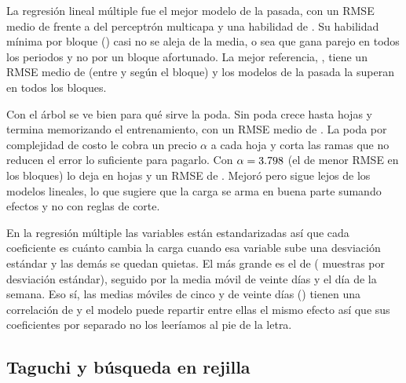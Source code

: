 \begin{table}[!htbp]
\centering
{}
\caption{Pasada didáctica de regresión con la media y la desviación entre
bloques: Las tres primeras filas son referencias sin modelo y la habilidad se
mide frente a , que es la mejor de ellas.}
\label{tab:reg-didactica}
\end{table}

La regresión lineal múltiple fue el mejor modelo de la pasada, con un RMSE
medio de \RegRMSELinealDidactico{} frente a \RegRMSEMLPDidactico{} del
perceptrón multicapa y una habilidad de \RegHabilidadMejorDidactico{}. Su
habilidad mínima por bloque (\RegHabilidadMinMejorDidactico{}) casi no se
aleja de la media, o sea que gana parejo en todos los periodos y no por un
bloque afortunado. La mejor referencia, \codigo{\RegMejorReferencia}, tiene un
RMSE medio de \RegRMSEReferencia{} (entre \RegRMSEReferenciaMin{} y
\RegRMSEReferenciaMax{} según el bloque) y los \RegDidacticosEstables{}
modelos de la pasada la superan en todos los bloques.

Con el árbol se ve bien para qué sirve la poda. Sin poda crece hasta
\RegHojasSinPoda{} hojas y termina memorizando el entrenamiento, con un RMSE
medio de \RegRMSESinPoda{}. La poda por complejidad de costo le cobra un
precio $\alpha$ a cada hoja y corta las ramas que no reducen el error lo
suficiente para pagarlo. Con $\alpha=3.798$ (el de menor RMSE en los
bloques) lo deja en \RegHojasPodado{} hojas y un RMSE de \RegRMSEPodado{}.
Mejoró pero sigue lejos de los modelos lineales, lo que sugiere que la carga
se arma en buena parte sumando efectos y no con reglas de corte.

En la regresión múltiple las variables están estandarizadas así que cada
coeficiente es cuánto cambia la carga cuando esa variable sube una desviación
estándar y las demás se quedan quietas. El más grande es el de
\codigo{\RegCoefPrincipal} (\RegCoefPrincipalValor{} muestras por desviación
estándar), seguido por la media móvil de veinte días y el día de la semana.
Eso sí, las medias móviles de cinco y de veinte días
(\codigo{\RegParRedundante}) tienen una correlación de \RegCorrParRedundante{}
y el modelo puede repartir entre ellas el mismo efecto así que sus
coeficientes por separado no los leeríamos al pie de la letra.

\subsection{Taguchi y búsqueda en rejilla}

